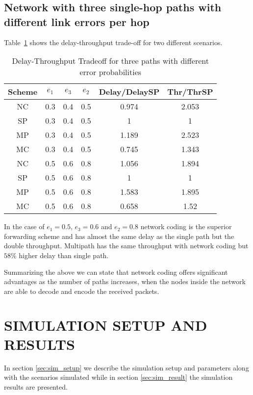 \documentclass[journal, onecolumn, 12pt]{IEEEtran}
\begin{document}
\subsection{Network with three single-hop paths with different link errors per hop}
\label{sec:numerical_diff_error_per_hop}

Table~\ref{table:trdiff} shows the delay-throughput trade-off for two different scenarios.
\begin{table}[ht]
\centering
\begin{tabular}{c c c c c c}
\hline\hline
Scheme & $e_{1}$ & $e_{3}$ & $e_{2}$ & Delay/DelaySP & Thr/ThrSP\\ [0.5ex]
\hline
NC & 0.3 & 0.4 & 0.5 & 0.974 & 2.053  \\
SP & 0.3 & 0.4 & 0.5 & 1 & 1  \\
MP & 0.3 & 0.4 & 0.5 & 1.189 & 2.523 \\
MC & 0.3 & 0.4 & 0.5 & 0.745 & 1.343 \\ [1ex]


NC & 0.5 & 0.6 & 0.8 & 1.056 & 1.894  \\
SP & 0.5 & 0.6 & 0.8 & 1 & 1  \\
MP & 0.5 & 0.6 & 0.8 & 1.583 & 1.895 \\
MC & 0.5 & 0.6 & 0.8 & 0.658 & 1.52 \\ [1ex]

\hline
\end{tabular}
\caption{Delay-Throughput Tradeoff for three paths with different error probabilities}
\label{table:trdiff}
\end{table}

In the case of $e_{1}=0.5$, $e_{3}=0.6$ and $e_{2}=0.8$ network coding is the superior forwarding scheme and has almost the same delay as the single path but the double throughput.
Multipath has the same throughput with network coding but $58\%$ higher delay than single path.

Summarizing the above we can state that network coding offers significant advantages as the number of paths increases, when the nodes inside the network are able to decode and encode the received packets.

\section{\uppercase{Simulation Setup and Results}}
\label{sec:simulation}

In section \ref{sec:sim_setup} we describe the simulation setup and parameters along with the scenarios simulated while in section \ref{sec:sim_result} the simulation results are presented.
\end{document}
